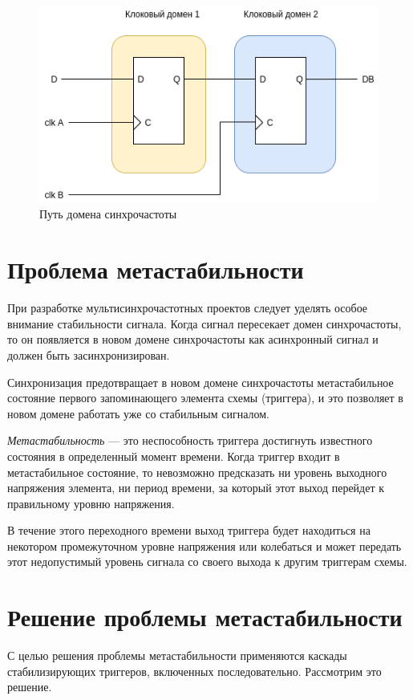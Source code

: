 \begin{figure}[h!]
	\centering
	\includegraphics[width=0.7\linewidth]{course-scheme/images/multiclock-domain}
	\caption{Путь домена синхрочастоты}
	\label{fig:multiclock-domain}
\end{figure}


\section{Проблема метастабильности}

При разработке мультисинхрочастотных проектов следует уделять особое внимание стабильности сигнала. Когда сигнал пересекает домен синхрочастоты, то он появляется в новом домене синхрочастоты как асинхронный сигнал и должен быть засинхронизирован.

Синхронизация предотвращает в новом домене синхрочастоты метастабильное состояние первого запоминающего элемента схемы (триггера), и это позволяет в новом домене работать уже со стабильным сигналом.

\textit{Метастабильность} --- это неспособность триггера достигнуть известного состояния в определенный момент времени. Когда триггер входит в метастабильное состояние, то невозможно предсказать ни уровень выходного напряжения элемента, ни период времени, за который этот выход перейдет к правильному уровню напряжения. 

В течение этого переходного времени выход триггера будет находиться на некотором промежуточном уровне напряжения или колебаться и может передать этот недопустимый уровень сигнала со своего выхода к другим триггерам схемы.

\section{Решение проблемы метастабильности}

С целью решения проблемы метастабильности применяются каскады стабилизирующих триггеров, включенных последовательно. Рассмотрим это решение.



